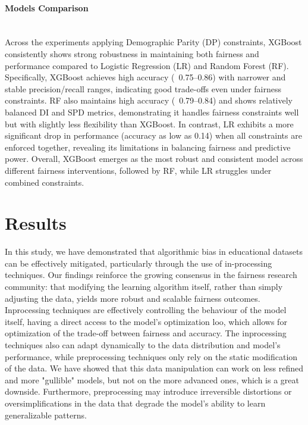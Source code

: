 \documentclass{article}
\begin{document}
\paragraph{Models Comparison}\mbox{}\\
Across the experiments applying Demographic Parity (DP) constraints, XGBoost consistently shows strong robustness in maintaining both fairness and performance compared to Logistic Regression (LR) and Random Forest (RF). Specifically, XGBoost achieves high accuracy (~0.75–0.86) with narrower and stable precision/recall ranges, indicating good trade-offs even under fairness constraints. RF also maintains high accuracy (~0.79–0.84) and shows relatively balanced DI and SPD metrics, demonstrating it handles fairness constraints well but with slightly less flexibility than XGBoost. In contrast, LR exhibits a more significant drop in performance (accuracy as low as 0.14) when all constraints are enforced together, revealing its limitations in balancing fairness and predictive power. Overall, XGBoost emerges as the most robust and consistent model across different fairness interventions, followed by RF, while LR struggles under combined constraints.

\section{Results}
In this study, we have demonstrated that algorithmic bias in educational datasets can be effectively mitigated, particularly through the use of in-processing techniques.
Our findings reinforce the growing consensus in the fairness research community: that modifying the learning algorithm itself, rather than simply adjusting the data, yields more robust and scalable fairness outcomes. Inprocessing techniques are effectively controlling the behaviour of the model itself, having a direct access to the model's optimization loo, which allows for optimization of the trade-off between fairness and accuracy. The inprocessing techniques also can adapt dynamically to the data distribution and model's performance, while preprocessing techniques only rely on the static modification of the data. We have showed that this data manipulation can work on less refined and more "gullible" models, but not on the more advanced ones, which is a great downside. Furthermore, preprocessing may introduce irreversible distortions or oversimplifications in the data that degrade the model’s ability to learn generalizable patterns.
\end{document}
